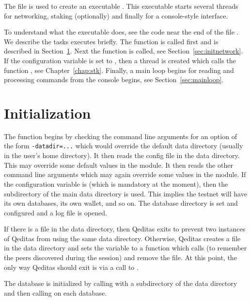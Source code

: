 The file {} is
used to create an executable
{}.
This executable starts several threads for networking, staking (optionally)
and finally for a console-style interface.

To understand what the executable {} does,
see the code near the end of the file {}.
We describe the tasks {} executes briefly.
The function {}
is called first and is described in Section~\ref{sec:init}.
Next the function {} is called,
see Section~\ref{sec:initnetwork}.
If the configuration variable {} is set to {},
then a thread is created which calls the function {},
see Chapter~\ref{chap:stk}.
Finally, a main loop begins for reading and processing commands
from the console begins,
see Section~\ref{sec:mainloop}.

\section{Initialization}\label{sec:init}

The {} function begins by checking the command line arguments for an option
of the form \verb+-datadir=...+
which would override the default data directory (usually {}
in the user's home directory).
It then reads the config file {} in the data directory.
This may override some default values in the {} module.
It then reads the other command line arguments which may again override
some values in the {} module.
If the {} configuration variable is {} (which is mandatory at the moment),
then the {} subdirectory of the main data directory is used.
This implies the testnet will have its own databases, its own wallet, and so on.
The database directory is set and configured and a log file is opened.

If there is a {} file in the data directory,
then Qeditas exits to prevent two instances of Qeditas from using the same data directory.
Otherwise, Qeditas creates a {} file in the data directory
and sets the variable {} to a function which calls {}
(to remember the peers discovered during the session) and remove the {} file.
At this point, the only way Qeditas should exit is via a call to {}.

The database is initialized by calling {} with a {} subdirectory of the data directory
and then calling {} on each database.

